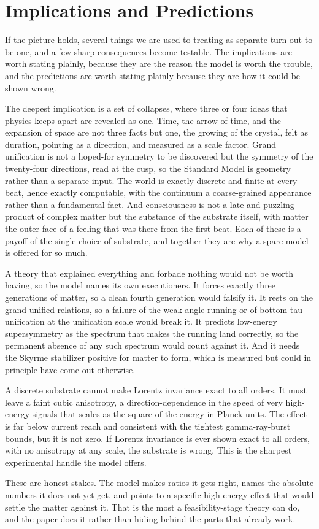\section{Implications and Predictions}

If the picture holds, several things we are used to treating as separate turn out to be one, and a few sharp consequences become testable. The implications are worth stating plainly, because they are the reason the model is worth the trouble, and the predictions are worth stating plainly because they are how it could be shown wrong.

The deepest implication is a set of collapses, where three or four ideas that physics keeps apart are revealed as one. Time, the arrow of time, and the expansion of space are not three facts but one, the growing of the crystal, felt as duration, pointing as a direction, and measured as a scale factor. Grand unification is not a hoped-for symmetry to be discovered but the symmetry of the twenty-four directions, read at the cusp, so the Standard Model is geometry rather than a separate input. The world is exactly discrete and finite at every beat, hence exactly computable, with the continuum a coarse-grained appearance rather than a fundamental fact. And consciousness is not a late and puzzling product of complex matter but the substance of the substrate itself, with matter the outer face of a feeling that was there from the first beat. Each of these is a payoff of the single choice of substrate, and together they are why a spare model is offered for so much.

A theory that explained everything and forbade nothing would not be worth having, so the model names its own executioners. It forces exactly three generations of matter, so a clean fourth generation would falsify it. It rests on the grand-unified relations, so a failure of the weak-angle running or of bottom-tau unification at the unification scale would break it. It predicts low-energy supersymmetry as the spectrum that makes the running land correctly, so the permanent absence of any such spectrum would count against it. And it needs the Skyrme stabilizer positive for matter to form, which is measured but could in principle have come out otherwise.

\begin{result}
A discrete substrate cannot make Lorentz invariance exact to all orders. It must leave a faint cubic anisotropy, a direction-dependence in the speed of very high-energy signals that scales as the square of the energy in Planck units. The effect is far below current reach and consistent with the tightest gamma-ray-burst bounds, but it is not zero. If Lorentz invariance is ever shown exact to all orders, with no anisotropy at any scale, the substrate is wrong. This is the sharpest experimental handle the model offers.
\end{result}

These are honest stakes. The model makes ratios it gets right, names the absolute numbers it does not yet get, and points to a specific high-energy effect that would settle the matter against it. That is the most a feasibility-stage theory can do, and the paper does it rather than hiding behind the parts that already work.

